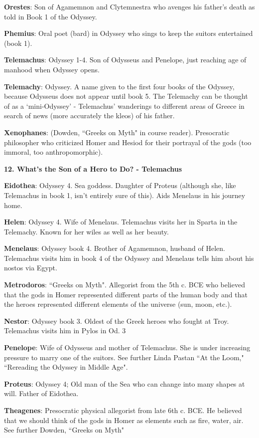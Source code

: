 \documentclass{scrartcl}
\begin{document}
\begin{multicols*}{3}
{\bf Orestes}: Son of Agamemnon and Clytemnestra who avenges his father's death as told in Book 1 of the Odyssey.

{\bf Phemius}: Oral poet (bard) in Odyssey who sings to keep the suitors entertained (book 1).

{\bf Telemachus}: Odyssey 1-4. Son of Odysseus and Penelope, just reaching age of manhood when Odyssey opens.

{\bf Telemachy}: Odyssey. A name given to the first four books of the Odyssey, because Odysseus does not appear until book 5. The Telemachy can be thought of as a `mini-Odyssey' - Telemachus' wanderings to different areas of Greece in search of news (more accurately the kleos) of his father.

{\bf Xenophanes}: (Dowden, ``Greeks on Myth" in course reader). Presocratic philosopher who criticized Homer and Hesiod for their portrayal of the gods (too immoral, too anthropomorphic).


{\bf 12. What's the Son of a Hero to Do? - Telemachus}

{\bf Eidothea}: Odyssey 4. Sea goddess. Daughter of Proteus (although she, like Telemachus in book 1, isn't entirely sure of this). Aids Menelaus in his journey home.

{\bf Helen}: Odyssey 4. Wife of Menelaus. 
Telemachus visits her in Sparta in the Telemachy. 
Known for her wiles as well as her beauty.

{\bf Menelaus}: Odyssey book 4. Brother of Agamemnon, husband of Helen. Telemachus visits him in book 4 of the Odyssey and Menelaus tells him about his nostos via Egypt.

{\bf Metrodoros}: ``Greeks on Myth". Allegorist from the 5th c. BCE who believed that the gods in Homer represented different parts of the human body and that the heroes represented different elements of the universe (sun, moon, etc.).

{\bf Nestor}: Odyssey book 3. Oldest of the Greek heroes who fought at Troy. Telemachus visits him in Pylos in Od. 3

{\bf Penelope}: Wife of Odysseus and mother of Telemachus. She is under increasing pressure to marry one of the suitors. See further Linda Pastan ``At the Loom," ``Rereading the Odyssey in Middle Age".

{\bf Proteus}: Odyssey 4; Old man of the Sea who can change into many shapes at will. Father of Eidothea.

{\bf Theagenes}: Presocratic physical allegorist from late 6th c. BCE. He believed that we should think of the gods in Homer as elements such as fire, water, air. See further Dowden, ``Greeks on Myth"


\end{multicols*}
\end{document}
